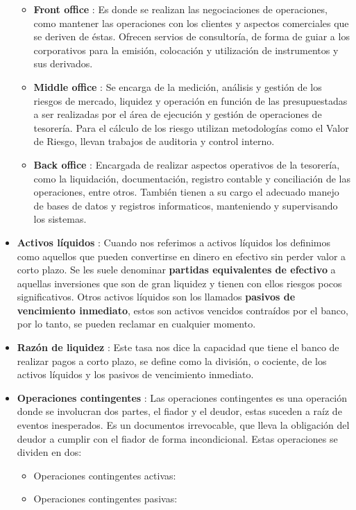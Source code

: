 \documentclass[]{article}
\providecommand{\tightlist}{%
  \setlength{\itemsep}{0pt}\setlength{\parskip}{0pt}}
\begin{document}
\begin{itemize}
  \begin{itemize}
  \item
    \textbf{Front office} : Es donde se realizan las negociaciones de
    operaciones, como mantener las operaciones con los clientes y
    aspectos comerciales que se deriven de éstas. Ofrecen servios de
    consultoría, de forma de guiar a los corporativos para la emisión,
    colocación y utilización de instrumentos y sus derivados.
  \item
    \textbf{Middle office} : Se encarga de la medición, análisis y
    gestión de los riesgos de mercado, liquidez y operación en función
    de las presupuestadas a ser realizadas por el área de ejecución y
    gestión de operaciones de tesorería. Para el cálculo de los riesgo
    utilizan metodologías como el Valor de Riesgo, llevan trabajos de
    auditoria y control interno.
  \item
    \textbf{Back office} : Encargada de realizar aspectos operativos de
    la tesorería, como la liquidación, documentación, registro contable
    y conciliación de las operaciones, entre otros. También tienen a su
    cargo el adecuado manejo de bases de datos y registros informaticos,
    manteniendo y supervisando los sistemas.
  \end{itemize}
\item
  \textbf{Activos líquidos} : Cuando nos referimos a activos líquidos
  los definimos como aquellos que pueden convertirse en dinero en
  efectivo sin perder valor a corto plazo. Se les suele denominar
  \textbf{partidas equivalentes de efectivo} a aquellas inversiones que
  son de gran liquidez y tienen con ellos riesgos pocos significativos.
  Otros activos líquidos son los llamados \textbf{pasivos de vencimiento
  inmediato}, estos son activos vencidos contraídos por el banco, por lo
  tanto, se pueden reclamar en cualquier momento.
\item
  \textbf{Razón de liquidez} : Este tasa nos dice la capacidad que tiene
  el banco de realizar pagos a corto plazo, se define como la división,
  o cociente, de los activos líquidos y los pasivos de vencimiento
  inmediato.
\item
  \textbf{Operaciones contingentes} : Las operaciones contingentes es
  una operación donde se involucran dos partes, el fiador y el deudor,
  estas suceden a raíz de eventos inesperados. Es un documentos
  irrevocable, que lleva la obligación del deudor a cumplir con el
  fiador de forma incondicional. Estas operaciones se dividen en dos:

  \begin{itemize}
  \tightlist
  \item
    Operaciones contingentes activas:
  \item
    Operaciones contingentes pasivas:
  \end{itemize}
\end{itemize}
\end{document}
